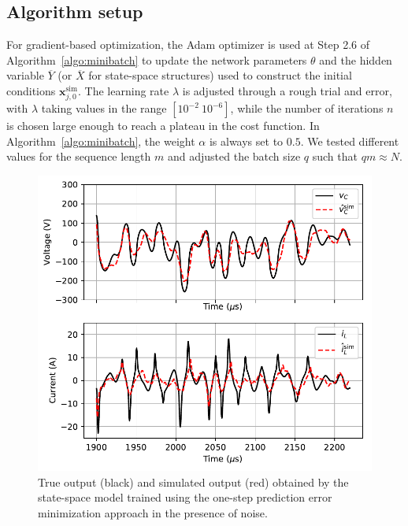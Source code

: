 \documentclass{article}
\newcommand{\numiter}{n}
\newcommand{\tens}[1]{\mathbf{#1}}
\newcommand{\hidden}[1]{\overline{#1}}
\begin{document}
\subsection{Algorithm setup}
For gradient-based optimization, the Adam optimizer is used at Step 2.6 of Algorithm~\ref{algo:minibatch} to update the network parameters $\theta$ and the hidden variable $\hidden{Y}$ (or $\hidden{X}$ for state-space structures) used to construct the initial conditions $\tens{x}_{j,0}^{\mathrm{sim}}$. The learning rate $\lambda$ is adjusted  through a rough trial and error, with $\lambda$ taking values in the  range $[10^{-2}~10^{-6}]$, while the number of iterations $\numiter$ is chosen large enough to reach a plateau in the cost function. 
In Algorithm~\ref{algo:minibatch}, the weight $\alpha$ is always set to $0.5$.  
We tested different values for the sequence length $m$ and adjusted the batch size $q$ such that $qm \approx N$. 

 \begin{figure}
	\centering
	\includegraphics[width=.7\linewidth]{fig/RLC_SS_val_1step_noise.pdf}
	\caption{True output (black) and  simulated output (red) obtained by the state-space model trained using the one-step prediction error minimization approach in the presence of noise.}
	\label{fig:RLC_SS_val_1step_noise}
\end{figure}
\end{document}
